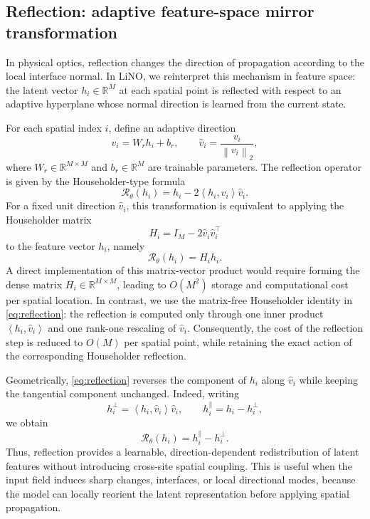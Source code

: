 \documentclass{article}
\newcommand{\R}{\mathbb{R}}
\newcommand{\cR}{\mathcal{R}}
\newcommand{\inner}[2]{\left\langle #1,#2\right\rangle}
\newcommand{\norm}[1]{\left\lVert #1\right\rVert}
\begin{document}
\subsection{Reflection: adaptive feature-space mirror transformation}

In physical optics, reflection changes the direction of propagation according to the local interface normal. In LiNO, we reinterpret this mechanism in feature space: the latent vector $h_i\in\R^M$ at each spatial point is reflected with respect to an adaptive hyperplane whose normal direction is learned from the current state.

For each spatial index $i$, define an adaptive direction
\begin{equation}
    v_i = W_r h_i + b_r, \qquad
    \widehat{v}_i = \frac{v_i}{\norm{v_i}_2},
    \label{eq:adaptive-normal}
\end{equation}
where $W_r\in\R^{M\times M}$ and $b_r\in\R^M$ are trainable parameters. The reflection operator is given by the Householder-type formula
\begin{equation}
    \cR_\theta(h_i)
    =
    h_i - 2\inner{h_i}{\widehat{v}_i}\widehat{v}_i.
    \label{eq:reflection}
\end{equation}
For a fixed unit direction $\widehat v_i$, this transformation is equivalent to applying the Householder matrix
\begin{equation}
    H_i = I_M - 2\widehat v_i \widehat v_i^\top
\end{equation}
to the feature vector $h_i$, namely
\begin{equation}
    \cR_\theta(h_i)=H_i h_i.
\end{equation}
A direct implementation of this matrix-vector product would require forming the dense matrix
$H_i\in\R^{M\times M}$, leading to $O(M^2)$ storage and computational cost per spatial location. In contrast, we use the matrix-free Householder identity in \eqref{eq:reflection}: the reflection is computed only through one inner product
$\inner{h_i}{\widehat v_i}$ and one rank-one rescaling of $\widehat v_i$. Consequently, the cost of the reflection step is reduced to $O(M)$ per spatial point, while retaining the exact action of the corresponding Householder reflection.

Geometrically, \eqref{eq:reflection} reverses the component of $h_i$ along $\widehat v_i$ while keeping the tangential component unchanged. Indeed, writing
\begin{equation}
    h_i^{\perp}=\inner{h_i}{\widehat v_i}\widehat v_i,
    \qquad
    h_i^{\parallel}=h_i-h_i^{\perp},
\end{equation}
we obtain
\begin{equation}
    \cR_\theta(h_i)=h_i^{\parallel}-h_i^{\perp}.
\end{equation}
Thus, reflection provides a learnable, direction-dependent redistribution of latent features without introducing cross-site spatial coupling. This is useful when the input field induces sharp changes, interfaces, or local directional modes, because the model can locally reorient the latent representation before applying spatial propagation.
\end{document}
